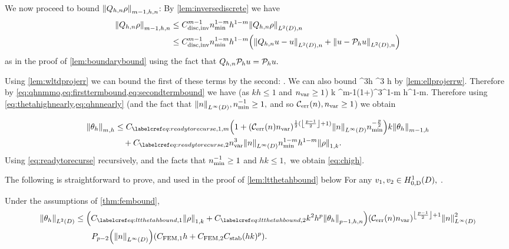 We now proceed to bound $\Nfn{m-1,h,n}{\Qhn \rho}$: By \cref{lem:inversediscrete} we have
\begin{align}
  \Nfn{m-1,h,n}{\Qhn \rho} &\leq\Chinv^{m-1} \nmin^{1-m}h^{1-m} \NLtDn{\Qhn\rho}\nonumber\\
  &\leq \Chinv^{m-1} \nmin^{1-m}h^{1-m} \mleft(\NLtDn{\Qhn u - u} + \NLtDn{u-\Ph u}\mright)\label{eq:qhnmmo}
\end{align}
as in the proof of \cref{lem:boundarybound} using the fact that $Q_{h,n} \mathcal P_{h} u = \mathcal P_{h} u.$

Using \cref{lem:wltdprojerr} we can bound the first of these terms by the second:
\beq\label{eq:firsttermbound}
 \leq {} \nvar {}.
\eeq
We can also bound
\beq\label{eq:secondtermbound}
 \leq {} \nvar^3h  \leq {} \nvar^3 h \NW{\rho}
\eeq
by \cref{lem:ellprojerrw}. Therefore by \cref{eq:qhnmmo,eq:firsttermbound,eq:secondtermbound} we have (as $kh \leq 1$ and $n_{\mathrm{var}} \geq 1$)
\beq\label{eq:qhnnearly}
k  \leq \Chinv^{m-1}\Cwz \mleft(1+\mright)\nvar^3\nmin^{1-m} h^{1-m}\NW{\rho}.
\eeq
Therefore using \cref{eq:thetahighnearly,eq:qhnnearly} (and the fact that $\NLiD{n}, \nmin^{-1} \geq 1,$ and so $\En, \nvar \geq1$)  we obtain

\begin{align}
  \Nfn{m,h}{\thetah} &\leq \CRecofn{m} \mleft(1+\mleft(\En\nvar\mright)^{\half(\floor{\frac{p-1}2}+1)}\NLiD{n}\nmin^{-\frac{p}2}\mright)k \Nfn{m-1,h}{\thetah}\nonumber\\
  &\quad+ \CRect \nvar^3\NLiD{n}\nmin^{1-m} h^{1-m} \NW{\rho}.\label{eq:readytorecurse}
\end{align}
Using \cref{eq:readytorecurse} recursively, and the facts that $n_{\min}^{-1} \geq 1$ and $hk \leq 1,$ we obtain \cref{eq:chigh}.
\epf

The following  is straightforward to prove, and used in the proof of \cref{lem:ltthetahbound} below
\ble[Continuity of $a$]\label{lem:continuity}
For any $\vo, \vt \in \HozDD,$
\beqs
{} \leq \Cc {} \NW{\vo}\NW{\vt}.
\eeqs
\ele

\label{lem:ltthetahbound}
Under the assumptions of \cref{thm:fembound},%
\begin{align}
\NLtD{\thetah}&\leq \mleft(\Cfirst\NW{\rho} +\Csecond  k^2h^p\Nfn{p-1,h,n}{\thetah}\mright)\mleft(\En \nvar\mright)^{\floor{\frac{p-1}2}+1}\NLiD{n}^2\nonumber\\
&\quad\quad\Pfn{p-2}\mleft(\NLiD{n}\mright)\mleft(\CFEMotilde h + \CFEMttilde \CAnk (hk)^p\mright).\label{eq:ltthetahbound}
\end{align}
\ele

